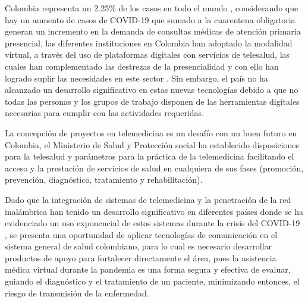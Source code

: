 \documentclass[12pt]{article}
\begin{document}
Colombia representa un 2.25\% de los casos en todo el mundo \cite{8}, considerando que hay un aumento de casos de COVID-19 que sumado a la cuarentena obligatoria generan un incremento en la demanda de consultas m\'edicas de atenci\'on primaria presencial, las diferentes instituciones en Colombia han adoptado la modalidad virtual, a trav\'es del  uso de plataformas digitales con servicios de telesalud, las cuales han complementado las destrezas de la presencialidad y con ello han logrado suplir las necesidades en este sector \cite{9}. Sin embargo, el pa\'is no ha alcanzado un desarrollo significativo en estas nuevas tecnolog\'ias debido a que no todas las personas y los grupos de trabajo disponen de las herramientas digitales necesarias para cumplir con las actividades requeridas. 

La concepci\'on de proyectos en telemedicina es un desaf\'io con un buen futuro en Colombia,  el Ministerio de Salud y Protecci\'on social ha establecido disposiciones para la telesalud y par\'ametros para la pr\'actica de la telemedicina facilitando el acceso y la prestaci\'on de servicios de salud en cualquiera de sus fases (promoci\'on, prevenci\'on, diagn\'ostico, tratamiento y rehabilitaci\'on)\cite{8}.



Dado que la integraci\'on de sistemas de telemedicina y la penetración de la red inalámbrica han tenido un desarrollo significativo en diferentes pa\'ises donde se ha evidenciado un uso exponencial de estos sistemas durante la crisis del COVID-19 \cite{10}, se presenta una oportunidad de aplicar tecnolog\'ias de comunicaci\'on en el sistema general de salud colombiano, para lo cual es necesario desarrollar productos de apoyo para fortalecer directamente el \'area, pues la asistencia m\'edica virtual durante la pandemia es una forma segura y efectiva de evaluar, guiando el diagn\'ostico y el tratamiento de un paciente, minimizando entonces, el riesgo de transmisi\'on de la enfermedad.
\end{document}
